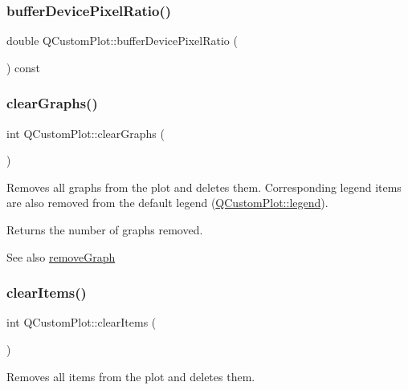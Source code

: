 \subsubsection{\texorpdfstring{bufferDevicePixelRatio()}{bufferDevicePixelRatio()}}
{\footnotesize\ttfamily double Q\+Custom\+Plot\+::buffer\+Device\+Pixel\+Ratio (\begin{DoxyParamCaption}{ }\end{DoxyParamCaption}) const\hspace{0.3cm}{\ttfamily [inline]}}

\mbox{\label{class_q_custom_plot_ab0f3abff2d2f7df3668b5836f39207fa}} 
\subsubsection{\texorpdfstring{clearGraphs()}{clearGraphs()}}
{\footnotesize\ttfamily int Q\+Custom\+Plot\+::clear\+Graphs (\begin{DoxyParamCaption}{ }\end{DoxyParamCaption})}

Removes all graphs from the plot and deletes them. Corresponding legend items are also removed from the default legend (\mbox{\hyperlink{class_q_custom_plot_a4eadcd237dc6a09938b68b16877fa6af}{Q\+Custom\+Plot\+::legend}}).

Returns the number of graphs removed.

\begin{DoxySeeAlso}{See also}
\mbox{\hyperlink{class_q_custom_plot_a903561be895fb6528a770d66ac5e6713}{remove\+Graph}} 
\end{DoxySeeAlso}
\mbox{\label{class_q_custom_plot_abdfd07d4f0591d0cf967f85013fd3645}} 
\subsubsection{\texorpdfstring{clearItems()}{clearItems()}}
{\footnotesize\ttfamily int Q\+Custom\+Plot\+::clear\+Items (\begin{DoxyParamCaption}{ }\end{DoxyParamCaption})}

Removes all items from the plot and deletes them.

